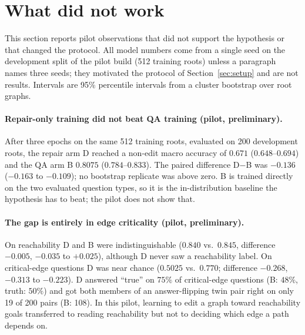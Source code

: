 \section{What did not work}
\label{sec:negative}

This section reports pilot observations that did not support the hypothesis or that changed the
protocol. All model numbers come from a single seed on the development split of the pilot build
(512 training roots) unless a paragraph names three seeds; they motivated the protocol of
Section~\ref{sec:setup} and are not results.
Intervals are 95\% percentile intervals from a cluster bootstrap over root graphs.

\paragraph{Repair-only training did not beat QA training (pilot, preliminary).}
After three epochs on the same 512 training roots, evaluated on 200 development roots, the repair
arm D reached a non-edit macro accuracy of $0.671$ ($0.648$--$0.694$) and the QA arm B $0.8075$
($0.784$--$0.833$). The paired difference D$-$B was $-0.136$ ($-0.163$ to $-0.109$); no bootstrap
replicate was above zero. B is trained directly on the two evaluated question types, so it is the
in-distribution baseline the hypothesis has to beat; the pilot does not show that.

\paragraph{The gap is entirely in edge criticality (pilot, preliminary).}
On reachability D and B were indistinguishable ($0.840$ vs.\ $0.845$, difference $-0.005$,
$-0.035$ to $+0.025$), although D never saw a reachability label. On critical-edge questions D was
near chance ($0.5025$ vs.\ $0.770$; difference $-0.268$, $-0.313$ to $-0.223$). D answered
``true'' on $75\%$ of critical-edge questions (B: $48\%$, truth: $50\%$) and got both members of an
answer-flipping twin pair right on only 19 of 200 pairs (B: 108). In this pilot, learning to edit a
graph toward reachability goals transferred to reading reachability but not to deciding which
edge a path depends on.

